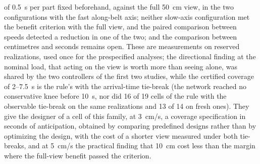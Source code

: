 \documentclass[11pt,a4paper]{article}
\begin{document}
of 0.5~s per part fixed beforehand, against the full 50~cm view, in the two configurations
with the fast along-belt axis; neither slow-axis configuration met the benefit criterion
with the full view, and the paired comparison between speeds detected a reduction in one
of the two; and the comparison between centimetres and seconds remains open. These are
measurements on reserved realizations, used once for the prespecified analyses; the directional finding at the
nominal load, that acting on the view is worth more than seeing alone, was shared by the
two controllers of the first two studies, while the certified coverage of 2--7.5~s is
the rule's with the arrival-time tie-break (the network reached no conservative knee
before 10~s, nor did 16 of 19 cells of the rule with the observable tie-break on the same
realizations and 13 of 14 on fresh ones). They give the
designer of a cell of this family, at 3~cm/s, a coverage specification in seconds of
anticipation, obtained by comparing predefined designs rather than by optimizing the
design, with the cost of a shorter view measured under both tie-breaks, and at 5~cm/s the practical finding that 10~cm cost less than
the margin where the full-view benefit passed the criterion.



\end{document}
